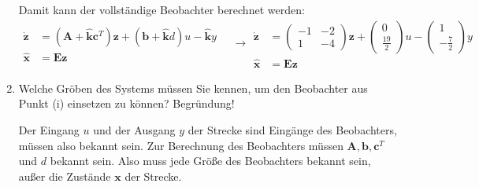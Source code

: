 \documentclass[crop=false]{standalone}
\begin{document}
\begin{task}
\begin{enumerate}[i]
\begin{solution}
     Damit kann der vollständige Beobachter berechnet werden:
     \[
\begin{aligned} \dot{\mathbf{z}} &=\left(\mathbf{A}+\hat{\mathbf{k}} \mathbf{c}^{T}\right) \mathbf{z}+(\mathbf{b}+\hat{\mathbf{k}} d) u-\hat{\mathbf{k}} y \\ \hat{\mathbf{x}} &=\mathbf{E} \mathbf{z} \end{aligned} \quad \rightarrow 
\begin{aligned} \dot{\mathbf{z}} &= 
\begin{pmatrix}
-1 & -2 \\ 1 & -4
\end{pmatrix} \mathbf{z}+
\begin{pmatrix}
0 \\ \frac{19}{2}
\end{pmatrix}
u-
\begin{pmatrix}
1 \\ -\frac{7}{2}
\end{pmatrix}
y \\ \hat{\mathbf{x}} &=\mathbf{E} \mathbf{z} \end{aligned}
\]
     \end{solution}
     \item Welche Gröben des Systems müssen Sie kennen, um den Beobachter aus Punkt
(i) einsetzen zu können? Begründung!
 \begin{solution}
 Der Eingang $u$ und der Ausgang $y$ der Strecke sind Eingänge des Beobachters, müssen also bekannt sein. Zur Berechnung des Beobachters müssen $\mathbf{A}, \mathbf{b}, \mathbf{c}^T$ und $d$ bekannt sein. Also muss jede Größe des Beobachters bekannt sein, außer die Zustände $\mathbf{x}$ der Strecke.
 \end{solution}
 \end{enumerate}
\end{task}
\end{document}
